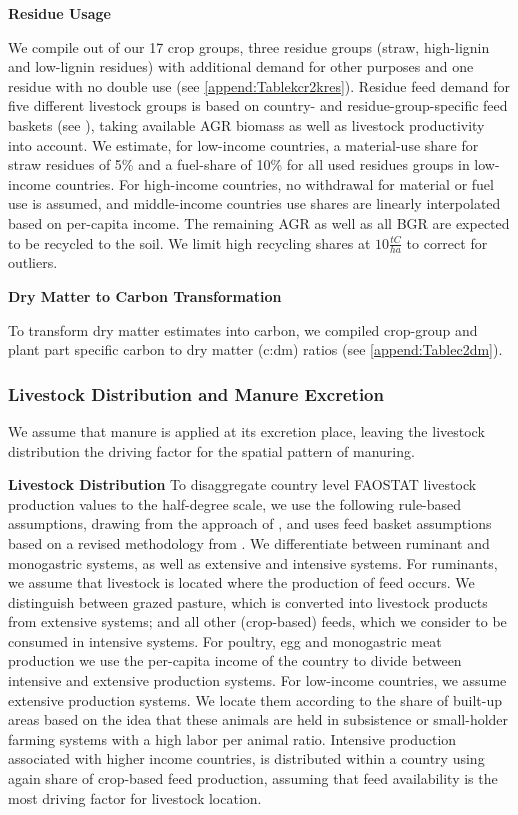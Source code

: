 \documentclass[gc, manuscript]{copernicus}
\begin{document}
\textbf{Residue Usage}

We compile out of our 17 crop groups, three residue groups (straw, high-lignin and low-lignin residues) with additional demand for other purposes and one residue with no double use (see \ref{append:Tablekcr2kres}). Residue feed demand for five different livestock groups is based on country- and residue-group-specific feed baskets (see \citep{weindl_livestock_2017}), taking available AGR biomass as well as livestock productivity into account. We estimate, for low-income countries, a material-use share for straw residues of 5\% and a fuel-share of 10\% for all used residues groups in low-income countries. For high-income countries, no withdrawal for material or fuel use is assumed, and middle-income countries use shares are linearly interpolated based on per-capita income. The remaining AGR as well as all BGR are expected to be recycled to the soil. We limit high recycling shares at \(10\tfrac{\unit{tC}}{\unit{ha}}\) to correct for outliers.

\textbf{Dry Matter to Carbon Transformation}

To transform dry matter estimates into carbon, we compiled crop-group and plant part specific carbon to dry matter (c:dm) ratios (see \ref{append:Tablec2dm}).

\hypertarget{sec:livstmanure}{%
\subsubsection{Livestock Distribution and Manure Excretion}\label{sec:livstmanure}}

We assume that manure is applied at its excretion place, leaving the livestock distribution the driving factor for the spatial pattern of manuring.

\textbf{Livestock Distribution}
To disaggregate country level FAOSTAT livestock production values to the half-degree scale, we use the following rule-based assumptions, drawing from the approach of \citep{robinson_mapping_2014}, and uses feed basket assumptions based on a revised methodology from \citep{weindl_livestock_2017}. We differentiate between ruminant and monogastric systems, as well as extensive and intensive systems.
For ruminants, we assume that livestock is located where the production of feed occurs. We distinguish between grazed pasture, which is converted into livestock products from extensive systems; and all other (crop-based) feeds, which we consider to be consumed in intensive systems.
For poultry, egg and monogastric meat production we use the per-capita income of the country to divide between intensive and extensive production systems. For low-income countries, we assume extensive production systems. We locate them according to the share of built-up areas based on the idea that these animals are held in subsistence or small-holder farming systems with a high labor per animal ratio. Intensive production associated with higher income countries, is distributed within a country using again share of crop-based feed production, assuming that feed availability is the most driving factor for livestock location.
\end{document}
